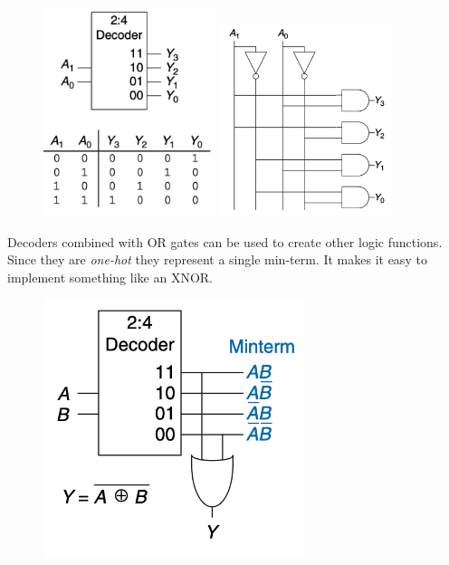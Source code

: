 \documentclass[12pt]{report}
\begin{document}
\begin{figure}[h!]
  \centering
  \includegraphics[width=0.45\textwidth]{2:4-decoder.png} %
  \hspace{0.05\textwidth} %
  \includegraphics[width=0.45\textwidth]{decoder-imp.png} %
\end{figure}

\noindent Decoders combined with OR gates can be used to create other logic functions. Since they are \textit{one-hot} they represent a single min-term. 
It makes it easy to implement something like an XNOR.  

\begin{figure}[h!]
  \centering
  \includegraphics[width=3in]{XNOR-decoder.png}
\end{figure}
\end{document}
